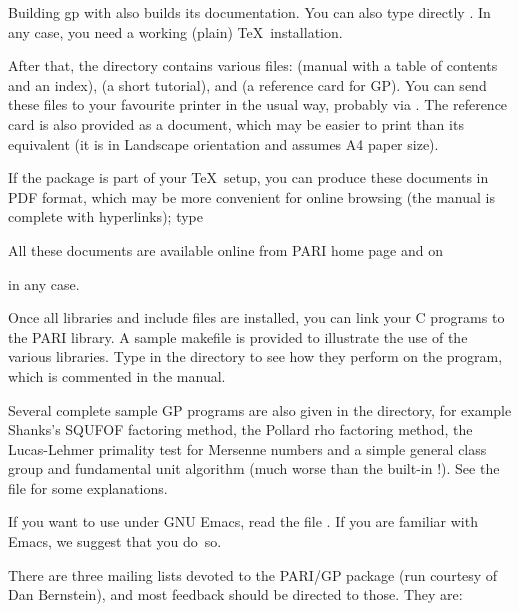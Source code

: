  Building gp with  also builds
its documentation. You can also type directly . In any case,
you need a working (plain) \TeX\ installation.

After that, the  directory contains various  files:
 (manual with a table of contents and an index),
 (a short tutorial), and  (a reference
card for GP). You can send these files to your favourite printer in the usual
way, probably via . The reference card is also provided as a
 document, which may be easier to print than its 
equivalent (it is in Landscape orientation and assumes A4 paper size).

\noindent If the  package is part of your \TeX\ setup, you can
produce these documents in PDF format, which may be more convenient for
online browsing (the manual is complete with hyperlinks); type


\noindent All these documents are available online from PARI home page and on


\noindent in any case.

 Once all libraries and include files are installed,
you can link your C programs to the PARI library. A sample makefile
 is provided to illustrate the use of the various
libraries. Type  in the  directory to see how
they perform on the  program, which is commented in the
manual.

 Several complete sample GP programs are also given in
the  directory, for example Shanks's SQUFOF factoring method,
the Pollard rho factoring method, the Lucas-Lehmer primality test for
Mersenne numbers and a simple general class group and fundamental unit
algorithm (much worse than the built-in !). See the file
 for some explanations.

 If you want to use  under GNU Emacs, read the file
. If you are familiar with Emacs, we suggest that
you do~so.

 There are three mailing lists devoted to the
PARI/GP package (run courtesy of Dan Bernstein), and most feedback should be
directed to those. They are:


